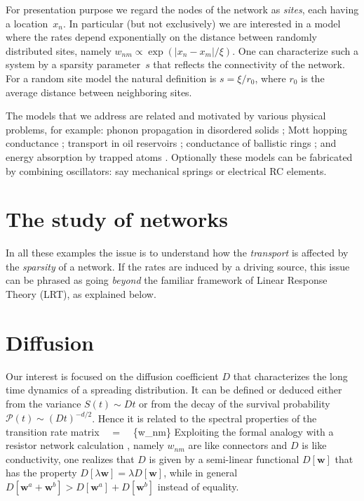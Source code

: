 For presentation purpose we regard the nodes of the network as {\em sites}, 
each having a location~$x_n$. In particular (but not exclusively) we are interested 
in a model where the rates depend exponentially on the distance 
between randomly distributed sites, namely $w_{nm}\propto \exp(|x_n-x_m|/\xi)$. 
One can characterize such a system by a sparsity parameter~$s$ 
that reflects the connectivity of the network. For a random site model
the natural definition is $s=\xi/r_0$, where $r_0$ is the average distance 
between neighboring sites. 


The models that we address are related and motivated  
by various physical problems, for example: 
phonon propagation in disordered solids \cite{phn1,phn2,amir}; 
Mott hopping conductance \cite{mott,miller,AHL,Halp,pollak,VRHbook};
transport in oil reservoirs \cite{aa1,aa2};
conductance of ballistic rings \cite{kbd};
and energy absorption by trapped atoms \cite{kbw}. 
%
Optionally these models can be fabricated by combining oscillators: 
say mechanical springs or electrical RC elements. 

\section{The study of networks}
%   
In all these examples the issue is to understand how 
the {\em transport} is affected by the {\em sparsity} of a network.  
If the rates are induced by a driving source, this issue can be phrased as  
going {\em beyond} the familiar framework of Linear Response Theory (LRT), 
as explained below.  

\section{Diffusion} 
Our interest is focused on the diffusion coefficient $D$ that characterizes the 
long time dynamics of a spreading distribution. It can be defined or deduced 
either from the variance ${S(t) \sim Dt}$ or from the decay of the 
survival probability ${\mathcal{P}(t) \sim (D t)^{-d/2}}$. Hence it is 
related to the spectral properties of the transition rate matrix 
%
\beq
{} \ \ = \ \ \{w_{nm}\}
\eeq
%
Exploiting the formal analogy with a resistor network calculation \cite{miller},  
namely $w_{nm}$ are like connectors and $D$ is like conductivity, 
one realizes that $D$ is given by a semi-linear functional $D[\bm{w}]$ 
that has the property ${D[\lambda \bm{w}] = \lambda D[\bm{w}]}$, 
while in general ${D[\bm{w}^a+\bm{w}^b] > D[\bm{w}^a]+D[\bm{w}^b]}$ instead of equality.      


